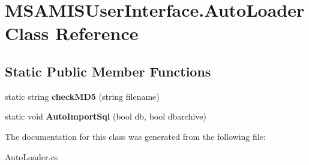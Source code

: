 \hypertarget{class_m_s_a_m_i_s_user_interface_1_1_auto_loader}{}\section{M\+S\+A\+M\+I\+S\+User\+Interface.\+Auto\+Loader Class Reference}
\label{class_m_s_a_m_i_s_user_interface_1_1_auto_loader}
\subsection*{Static Public Member Functions}
\begin{DoxyCompactItemize}
\item 
\mbox{\label{class_m_s_a_m_i_s_user_interface_1_1_auto_loader_a095a19cea52f90b2df959dc734e638d8}} 
static string {\bfseries check\+M\+D5} (string filename)
\item 
\mbox{\label{class_m_s_a_m_i_s_user_interface_1_1_auto_loader_a6c56208264f31585b18bb24efbc828fd}} 
static void {\bfseries Auto\+Import\+Sql} (bool db, bool dbarchive)
\end{DoxyCompactItemize}


The documentation for this class was generated from the following file\+:\begin{DoxyCompactItemize}
\item 
Auto\+Loader.\+cs\end{DoxyCompactItemize}
